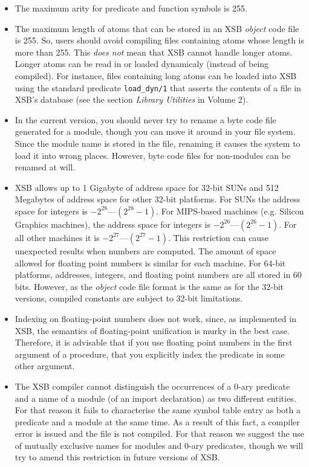 \begin{itemize}
\item	The maximum arity for predicate and function symbols is 255.
%
\item	The maximum length of atoms that can be stored in an XSB
  \emph{object} code file is 255.  So, users should avoid compiling files
  containing atoms whose length is more than 255. This \emph{does not} mean
  that XSB cannot handle longer atoms. Longer atoms can be read in or
  loaded dynamicaly (instead of being compiled).  For instance, files
  containing long atoms can be loaded into XSB using the standard
  predicate {\tt load\_dyn/1} that asserts the contents of a file in XSB's
  database (see the section {\em Library Utilities} in Volume 2).
%
\item	In the current version, you should never try to rename a byte code 
      file generated for a module, though you can move it around in your 
      file system.  Since the module name is stored in the file, renaming it
      causes the system to load it into wrong places.  However, byte code 
      files for non-modules can be renamed at will.
%
\item XSB allows up to 1 Gigabyte of address space for 32-bit SUNs and 512
      Megabytes of address space for other 32-bit platforms.  For SUNs the
      address space for integers is $-2^{28}$---$(2^{28}-1)$.  For
      MIPS-based machines (e.g. Silicon Graphics machines), the
      address space for integers is $-2^{26}$---$(2^{26}-1)$.  For all
      other machines it is $-2^{27}$---$(2^{27}-1)$.  This restriction can
      cause unexpected results when numbers are computed.  The amount
      of space allowed for floating point numbers is similar for each
      machine.  For 64-bit platforms, addresses, integers, and
      floating point numbers are all stored in 60 bits. However, as the
      \emph{object} code file format is the same as for the 32-bit versions,
      compiled constants are subject to 32-bit limitations.
%
\item	Indexing on floating-point numbers does not work, since, as
implemented in XSB, the semantics
      of floating-point unification is murky in the best case. Therefore, it
      is advisable that if you use floating point numbers in the first 
      argument of a procedure,  that you explicitly index the
      predicate in some other argument.
%
\item	The XSB compiler cannot distinguish the occurrences of a
      0-ary predicate and a name of a module (of an import declaration) as
      two different entities.  For that reason it fails to characterise the
      same symbol table entry as both a predicate and a module at the
      same time.  As a result of this fact, a compiler error is issued
      and the file is not compiled.  For that reason we suggest the
      use of mutually exclusive names for modules and 0-ary predicates,
      though we will try to amend this restriction in future versions of
      XSB.
\end{itemize}

